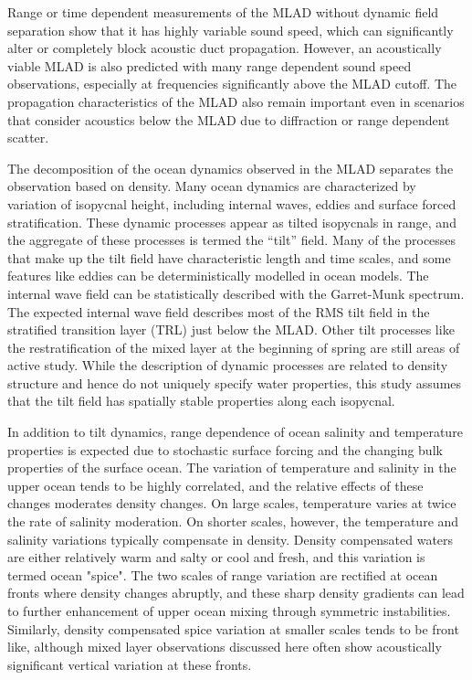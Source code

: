 \documentclass[preprint,NumberedRefs]{JASA}
\begin{document}
Range or time dependent measurements of the MLAD without dynamic field separation show that it has highly variable sound speed\citep{cole2010seasonal,rudnick1999compensation,klymak2015}, which can significantly alter or completely block acoustic duct propagation\citep{colosi2020observations,colosi21}. However, an acoustically viable MLAD is also predicted with many range dependent sound speed observations, especially at frequencies significantly above the MLAD cutoff. The propagation characteristics of the MLAD also remain important even in scenarios that consider acoustics below the MLAD due to diffraction or range dependent scatter\citep{colosi21}.

The decomposition of the ocean dynamics observed in the MLAD separates the observation based on density. Many ocean dynamics are characterized by variation of isopycnal height, including internal waves, eddies and surface forced stratification. These dynamic processes appear as tilted isopycnals in range, and the aggregate of these processes is termed the ``tilt'' field\cite{dzieciuch2004}. Many of the processes that make up the tilt field have characteristic length and time scales, and some features like eddies can be deterministically modelled in ocean models. The internal wave field can be statistically described with the Garret-Munk spectrum\cite{garrett1972space}. The expected internal wave field describes most of the RMS tilt field in the stratified transition layer (TRL) just below the MLAD. Other tilt processes like the restratification of the mixed layer at the beginning of spring are still areas of active study\cite{cole2010seasonal}. While the description of dynamic processes are related to density structure and hence do not uniquely specify water properties, this study assumes that the tilt field has spatially stable properties along each isopycnal.

In addition to tilt dynamics, range dependence of ocean salinity and temperature properties is expected due to stochastic surface forcing and the changing bulk properties of the surface ocean\citep{ferrari2000}. The variation of temperature and salinity in the upper ocean tends to be highly correlated, and the relative effects of these changes moderates density changes. On large scales, temperature varies at twice the rate of salinity moderation. On shorter scales, however, the temperature and salinity variations typically compensate in density. Density compensated waters are either relatively warm and salty or cool and fresh, and this variation is termed ocean "spice"\citep{munk1981evolution}. The two scales of range variation are rectified at ocean fronts where density changes abruptly, and these sharp density gradients can lead to further enhancement of upper ocean mixing through symmetric instabilities\citep{dasaro2011}. Similarly, density compensated spice variation at smaller scales tends to be front like, although mixed layer observations discussed here often show acoustically significant vertical variation at these fronts.
\end{document}
